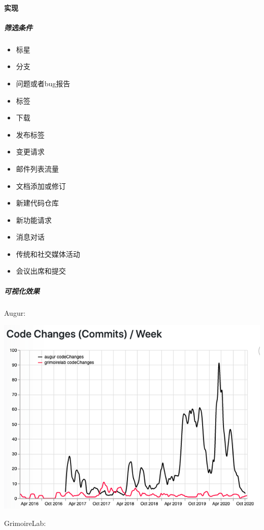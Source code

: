 \hypertarget{ux5b9eux73b0}{%
\paragraph{实现}\label{ux5b9eux73b0}}

\hypertarget{ux7b5bux9009ux6761ux4ef6}{%
\subparagraph{筛选条件}\label{ux7b5bux9009ux6761ux4ef6}}

\begin{itemize}
\tightlist
\item
  标星
\item
  分支
\item
  问题或者bug报告
\item
  标签
\item
  下载
\item
  发布标签
\item
  变更请求
\item
  邮件列表流量
\item
  文档添加或修订
\item
  新建代码仓库
\item
  新功能请求
\item
  消息对话
\item
  传统和社交媒体活动
\item
  会议出席和提交
\end{itemize}

\hypertarget{ux53efux89c6ux5316ux6548ux679c}{%
\subparagraph{可视化效果}\label{ux53efux89c6ux5316ux6548ux679c}}

Augur:

\includegraphics{images/burstiness_augur.png}

GrimoireLab:

